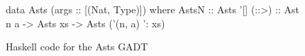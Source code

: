 \begin{figure}
    \begin{hskcode}
    data Asts (args :: [(Nat, Type)]) where
        AstsN     :: Asts '[]
        (::>)     :: Ast n a -> Asts xs -> Asts ('(n, a) ': xs)
    \end{hskcode}
    \caption{Haskell code for the Asts GADT}
    \label{fig:nestedlist}
\end{figure}